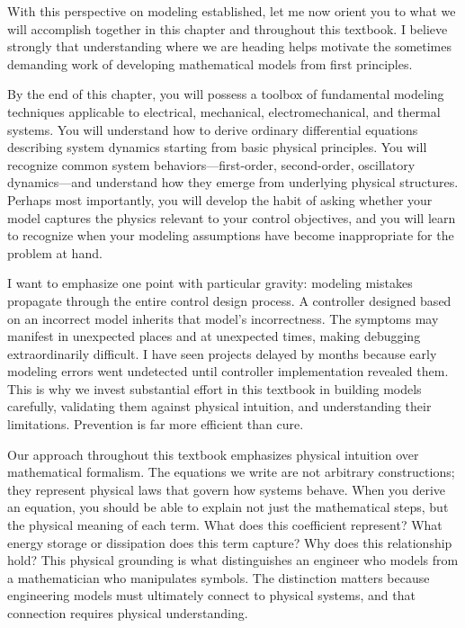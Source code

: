 
With this perspective on modeling established, let me now orient you to what we will accomplish together in this chapter and throughout this textbook. I believe strongly that understanding where we are heading helps motivate the sometimes demanding work of developing mathematical models from first principles.

By the end of this chapter, you will possess a toolbox of fundamental modeling techniques applicable to electrical, mechanical, electromechanical, and thermal systems. You will understand how to derive ordinary differential equations describing system dynamics starting from basic physical principles. You will recognize common system behaviors---first-order, second-order, oscillatory dynamics---and understand how they emerge from underlying physical structures. Perhaps most importantly, you will develop the habit of asking whether your model captures the physics relevant to your control objectives, and you will learn to recognize when your modeling assumptions have become inappropriate for the problem at hand.

I want to emphasize one point with particular gravity: modeling mistakes propagate through the entire control design process. A controller designed based on an incorrect model inherits that model's incorrectness. The symptoms may manifest in unexpected places and at unexpected times, making debugging extraordinarily difficult. I have seen projects delayed by months because early modeling errors went undetected until controller implementation revealed them. This is why we invest substantial effort in this textbook in building models carefully, validating them against physical intuition, and understanding their limitations. Prevention is far more efficient than cure.

Our approach throughout this textbook emphasizes physical intuition over mathematical formalism. The equations we write are not arbitrary constructions; they represent physical laws that govern how systems behave. When you derive an equation, you should be able to explain not just the mathematical steps, but the physical meaning of each term. What does this coefficient represent? What energy storage or dissipation does this term capture? Why does this relationship hold? This physical grounding is what distinguishes an engineer who models from a mathematician who manipulates symbols. The distinction matters because engineering models must ultimately connect to physical systems, and that connection requires physical understanding.

